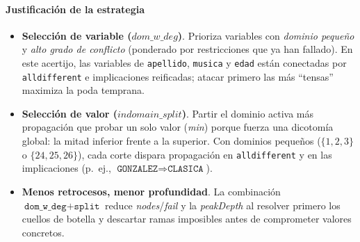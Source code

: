 \paragraph{Justificación de la estrategia}
\begin{itemize}
  \item \textbf{Selección de variable (\(dom\_w\_deg\))}. Prioriza variables con \emph{dominio pequeño} y \emph{alto grado de conflicto} (ponderado por restricciones que ya han fallado). En este acertijo, las variables de \texttt{apellido}, \texttt{musica} y \texttt{edad} están conectadas por \texttt{alldifferent} e implicaciones reificadas; atacar primero las más “tensas” maximiza la poda temprana.
  \item \textbf{Selección de valor (\(indomain\_split\))}. Partir el dominio activa más propagación que probar un solo valor (\emph{min}) porque fuerza una dicotomía global: la mitad inferior frente a la superior. Con dominios pequeños (\(\{1,2,3\}\) o \(\{24,25,26\}\)), cada corte dispara propagación en \texttt{alldifferent} y en las implicaciones (p.~ej., \(\texttt{GONZALEZ}\Rightarrow\texttt{CLASICA}\)).
  \item \textbf{Menos retrocesos, menor profundidad}. La combinación \(\texttt{dom\_w\_deg}+\texttt{split}\) reduce \textit{nodes}/\textit{fail} y la \textit{peakDepth} al resolver primero los cuellos de botella y descartar ramas imposibles antes de comprometer valores concretos.
\end{itemize}